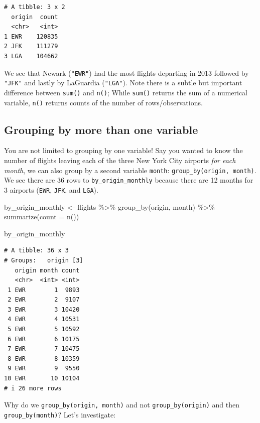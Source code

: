 \documentclass[
  letterpaper,
  DIV=11,
  numbers=noendperiod]{scrreprt}
\newenvironment{Shaded}{\begin{snugshade}}{\end{snugshade}}
\newcommand{\AttributeTok}[1]{\textcolor[rgb]{0.40,0.45,0.13}{#1}}
\newcommand{\FunctionTok}[1]{\textcolor[rgb]{0.28,0.35,0.67}{#1}}
\newcommand{\NormalTok}[1]{\textcolor[rgb]{0.00,0.23,0.31}{#1}}
\newcommand{\OtherTok}[1]{\textcolor[rgb]{0.00,0.23,0.31}{#1}}
\newcommand{\SpecialCharTok}[1]{\textcolor[rgb]{0.37,0.37,0.37}{#1}}
\theoremstyle{definition}
\theoremstyle{remark}
\begin{document}
\begin{verbatim}
# A tibble: 3 x 2
  origin  count
  <chr>   <int>
1 EWR    120835
2 JFK    111279
3 LGA    104662
\end{verbatim}

We see that Newark (\texttt{"EWR"}) had the most flights departing in
2013 followed by \texttt{"JFK"} and lastly by LaGuardia
(\texttt{"LGA"}). Note there is a subtle but important difference
between \texttt{sum()} and \texttt{n()}; While \texttt{sum()} returns
the sum of a numerical variable, \texttt{n()} returns counts of the
number of rows/observations.

\hypertarget{grouping-by-more-than-one-variable}{%
\subsection{Grouping by more than one
variable}\label{grouping-by-more-than-one-variable}}

You are not limited to grouping by one variable! Say you wanted to know
the number of flights leaving each of the three New York City airports
\emph{for each month}, we can also group by a second variable
\texttt{month}: \texttt{group\_by(origin,\ month)}. We see there are 36
rows to \texttt{by\_origin\_monthly} because there are 12 months for 3
airports (\texttt{EWR}, \texttt{JFK}, and \texttt{LGA}).

\begin{Shaded}
\begin{Highlighting}[]
\NormalTok{by\_origin\_monthly }\OtherTok{\textless{}{-}}\NormalTok{ flights }\SpecialCharTok{\%\textgreater{}\%} 
  \FunctionTok{group\_by}\NormalTok{(origin, month) }\SpecialCharTok{\%\textgreater{}\%} 
  \FunctionTok{summarize}\NormalTok{(}\AttributeTok{count =} \FunctionTok{n}\NormalTok{())}

\NormalTok{by\_origin\_monthly}
\end{Highlighting}
\end{Shaded}

\begin{verbatim}
# A tibble: 36 x 3
# Groups:   origin [3]
   origin month count
   <chr>  <int> <int>
 1 EWR        1  9893
 2 EWR        2  9107
 3 EWR        3 10420
 4 EWR        4 10531
 5 EWR        5 10592
 6 EWR        6 10175
 7 EWR        7 10475
 8 EWR        8 10359
 9 EWR        9  9550
10 EWR       10 10104
# i 26 more rows
\end{verbatim}

Why do we \texttt{group\_by(origin,\ month)} and not
\texttt{group\_by(origin)} and then \texttt{group\_by(month)}? Let's
investigate:
\end{document}
